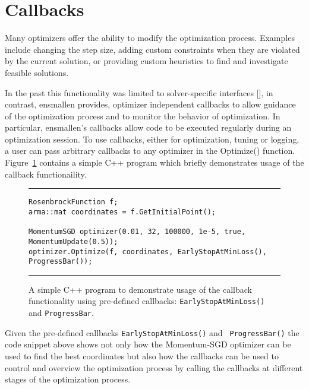 \section{Callbacks}
\label{sec:callbacks}

Many optimizers offer the ability to modify the optimization process. Examples
include changing the step size, adding custom constraints when they are violated
by the current solution, or providing custom heuristics to find and investigate
feasible solutions.

In the past this functionality was limited to solver-specific interfaces [], in
contrast, ensmallen provides, optimizer independent callbacks to allow guidance
of the optimization process and to monitor the behavior of optimization. In
particular, ensmallen's callbacks allow code to be executed regularly during an
optimization session. To use callbacks, either for optimization, tuning or
logging, a user can pass arbitrary callbacks to any optimizer in the Optimize()
function. Figure~\ref{fig:example_prog_callbacks} contains a simple C++ program which briefly demonstrates usage of the callback functionaility.

\begin{figure}[H]
\centering
\hrule
\vspace{1ex}
\begin{adjustbox}{minipage=\columnwidth,scale={0.90}{0.85}}
\begin{verbatim}
RosenbrockFunction f;
arma::mat coordinates = f.GetInitialPoint();

MomentumSGD optimizer(0.01, 32, 100000, 1e-5, true, MomentumUpdate(0.5));
optimizer.Optimize(f, coordinates, EarlyStopAtMinLoss(), ProgressBar());
\end{verbatim}
\end{adjustbox}
\vspace{1ex}
\hrule
\caption
  {
  A simple C++ program to demonstrate usage of the callback functionality using pre-defined callbacks: \texttt{EarlyStopAtMinLoss()} and \texttt{ProgressBar}.
  }
\label{fig:example_prog_callbacks}
\end{figure}

Given the pre-defined callbacks {\tt EarlyStopAtMinLoss()} and {\tt
ProgressBar()} the code snippet above shows not only how the Momentum-SGD
optimizer can be used to find the best coordinates but also how the callbacks
can be used to control and overview the optimization process by calling the
callbacks at different stages of the optimization process.\newline

